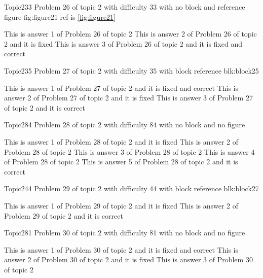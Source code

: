 \documentclass[master]{exam}
\begin{document}
\begin{problem}{Topic2}{33}
	Problem 26 of topic 2 with difficulty 33 with no block and reference figure fig:figure21 ref is \ref{fig:figure21}
	\begin{answers}
		\answer This is answer 1 of Problem 26 of topic 2 
		\answer[fixed] This is answer 2 of Problem 26 of topic 2 and it is fixed
		 This is answer 3 of Problem 26 of topic 2 and it is fixed and correct
	\end{answers}
\end{problem}

\begin{problem}[requires=blk:block25]{Topic2}{35}
	Problem 27 of topic 2 with difficulty 35 with block reference blk:block25
	\begin{answers}
		 This is answer 1 of Problem 27 of topic 2 and it is fixed and correct
		\answer[fixed] This is answer 2 of Problem 27 of topic 2 and it is fixed
		\answer[correct] This is answer 3 of Problem 27 of topic 2 and it is correct
	\end{answers}
\end{problem}

\begin{problem}{Topic2}{84}
	Problem 28 of topic 2 with difficulty 84 with no block and no figure
	\begin{answers}
		\answer[fixed] This is answer 1 of Problem 28 of topic 2 and it is fixed
		\answer This is answer 2 of Problem 28 of topic 2 
		\answer This is answer 3 of Problem 28 of topic 2 
		\answer This is answer 4 of Problem 28 of topic 2 
		\answer[correct] This is answer 5 of Problem 28 of topic 2 and it is correct
	\end{answers}
\end{problem}

\begin{problem}[requires=blk:block27]{Topic2}{44}
	Problem 29 of topic 2 with difficulty 44 with block reference blk:block27
	\begin{answers}
		\answer[fixed] This is answer 1 of Problem 29 of topic 2 and it is fixed
		\answer[correct] This is answer 2 of Problem 29 of topic 2 and it is correct
	\end{answers}
\end{problem}

\begin{problem}{Topic2}{81}
	Problem 30 of topic 2 with difficulty 81 with no block and no figure
	\begin{answers}
		 This is answer 1 of Problem 30 of topic 2 and it is fixed and correct
		\answer[fixed] This is answer 2 of Problem 30 of topic 2 and it is fixed
		\answer This is answer 3 of Problem 30 of topic 2 
	\end{answers}
\end{problem}
\end{document}
